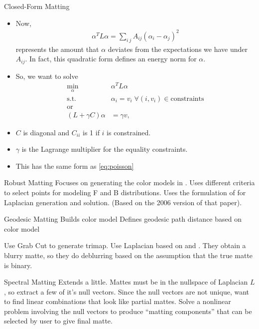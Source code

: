 \documentclass{beamer}
\begin{document}
\begin{frame}[allowframebreaks]{Closed-Form Matting \cite{levin2008closed}}
\begin{itemize}
  \item Now,
   \begin{align}
    \alpha^T L \alpha = \sum_{i~j} A_{ij}(\alpha_i-\alpha_j)^2
   \end{align}
   represents the amount that $\alpha$ deviates from the expectations we have
   under $A_{ij}$. In fact, this quadratic form defines an energy norm for $\alpha$.
  \item So, we want to solve
   \begin{align}
    \min_\alpha \; &\alpha^TL\alpha \\
    \text{s.t.} \; &\alpha_i = v_i \; \forall (i,v_i) \in \text{constraints} \nonumber \\
    \text{or} \nonumber \\
    (L + \gamma C) \alpha &= \gamma v,
   \end{align}
  \item $C$ is diagonal and $C_{ii}$ is 1 if $i$ is constrained.
  \item $\gamma$ is the Lagrange multiplier for the equality constraints.
  \item This has the same form as \eqref{eq:poisson}
 \end{itemize}
\end{frame}

\begin{frame}[allowframebreaks]{Robust Matting \cite{wang2007optimized}}
 Focuses on generating the color models in \cite{chuang2001bayesian}.
 Uses different criteria to select points for modeling F and B distributions.
 Uses the formulation of \cite{levin2008closed} for Laplacian generation and solution.
 (Based on the 2006 version of that paper).
\end{frame}

\begin{frame}[allowframebreaks]{Geodesic Matting\cite{bai2007geodesic}}
 Builds color model
 Defines geodesic path distance based on color model
\end{frame}

\begin{frame}[allowframebreaks]{\cite{rhemann2008high}}
 Use Grab Cut \cite{rother2004grabcut} to generate trimap.
 Use Laplacian based on \cite{levin2008closed} and \cite{wang2007optimized}.
 They obtain a blurry matte, so they do deblurring based on the assumption that
 the true matte is binary.
\end{frame}

\begin{frame}[allowframebreaks]{Spectral Matting \cite{levin2008spectral}}
 Extends \cite{levin2008closed} a little.
 Mattes must be in the nullspace of Laplacian $L$, so extract a few of it's null vectors.
 Since the null vectors are not unique, want to find linear combinations that
 look like partial mattes.
 Solve a nonlinear problem involving the null vectors to produce ``matting components''
 that can be selected by user to give final matte.
\end{frame}
\end{document}
